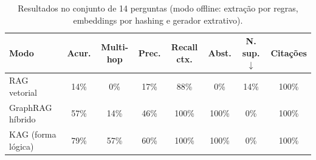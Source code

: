 \begin{table}[ht]
\centering
\caption{Resultados no conjunto de 14 perguntas (modo offline: extração por regras, embeddings por hashing e gerador extrativo).}
\label{tab:resultados}
\begin{tabular}{lccccccc}
\hline
Modo & Acur. & Multi-hop & Prec. & Recall ctx. & Abst. & N. sup.$\downarrow$ & Citações \\
\hline
RAG vetorial & 14\% & 0\% & 17\% & 88\% & 0\% & 14\% & 100\% \\
GraphRAG híbrido & 57\% & 14\% & 46\% & 100\% & 100\% & 0\% & 100\% \\
KAG (forma lógica) & 79\% & 57\% & 60\% & 100\% & 100\% & 0\% & 100\% \\
\hline
\end{tabular}
\end{table}
